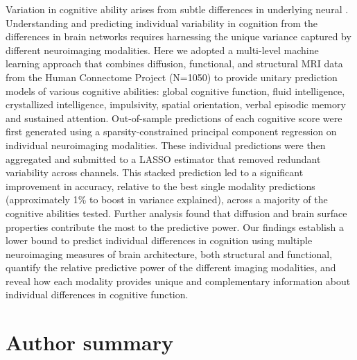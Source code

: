 \documentclass[10pt,letterpaper]{article}
\begin{document}
Variation in cognitive ability arises from subtle differences in underlying neural . Understanding and predicting individual variability in cognition from the differences in brain networks requires harnessing the unique variance captured by different neuroimaging modalities. Here we adopted a multi-level machine learning approach that combines diffusion, functional, and structural MRI data from the Human Connectome Project (N=1050) to provide unitary prediction models of various cognitive abilities: global cognitive function, fluid intelligence, crystallized intelligence, impulsivity, spatial orientation, verbal episodic memory and sustained attention. Out-of-sample predictions of each cognitive score were first generated using a sparsity-constrained principal component regression on individual neuroimaging modalities. These individual predictions were then aggregated and submitted to a LASSO estimator that removed redundant variability across channels. This stacked prediction led to a significant improvement in accuracy, relative to the best single modality predictions (approximately 1\% to  boost in variance explained), across a majority of the cognitive abilities tested. Further analysis found that diffusion and brain surface properties contribute the most to the predictive power. Our findings establish a lower bound to predict individual differences in cognition using multiple neuroimaging measures of brain architecture, both structural and functional, quantify the relative predictive power of the different imaging modalities, and reveal how each modality provides unique and complementary information about individual differences in cognitive function. 

\section*{Author summary}
\end{document}

